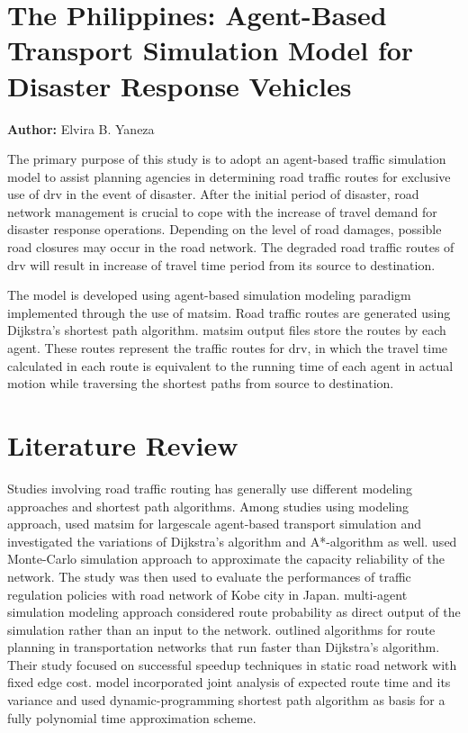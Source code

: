 \section{The Philippines: Agent-Based Transport Simulation Model for Disaster Response Vehicles}
\label{sec:philippines}
\hfill \textbf{Author:} Elvira B. Yaneza

The primary purpose of this study is to adopt an agent-based traffic simulation model to assist planning agencies in determining road traffic routes for exclusive use of \gls{drv} in the event of disaster. After the initial period of disaster, road network management is crucial to cope with the increase of travel demand for disaster response operations. Depending on the level of road damages, possible road closures may occur in the road network. The degraded road traffic routes of \gls{drv} will result in increase of travel time period from its source to destination.

The model is developed using agent-based simulation modeling paradigm implemented through the use of \gls{matsim}. Road traffic routes are generated using Dijkstra’s shortest path algorithm. \gls{matsim} output files store the routes by each agent. These routes represent the traffic routes for \gls{drv}, in which the travel time calculated in each route is equivalent to the running time of each agent in actual motion while traversing the shortest paths from source to destination. 

\section{Literature Review}
Studies involving road traffic routing has generally use different modeling approaches and shortest path algorithms. Among studies using modeling approach, \citet[][]{LefebvreBalmer_TechRep_IVT_2007} used \gls{matsim} for \gls{largescale} agent-based transport simulation and investigated the variations of Dijkstra’s algorithm and A*-algorithm as well. \citet[][]{SumaleeKurauchi_NSE_2006} used Monte-Carlo simulation approach to approximate the capacity reliability of the network. The study was then used to evaluate the performances of traffic regulation policies with road network of Kobe city in Japan. \citet[][]{Teknomo_TSSP_2008} multi-agent simulation modeling approach considered route probability as direct output of the simulation rather than an input to the network. \citet[][]{SandersSchultes_WEA_2007} outlined algorithms for route planning in transportation networks that run faster than Dijkstra’s algorithm. Their study focused on successful speedup techniques in static road network with fixed edge cost. \citet[][]{Elalouf_JSSM_2012} model incorporated joint analysis of expected route time and its variance and used dynamic-programming shortest path algorithm as basis for a fully polynomial time approximation scheme. 

